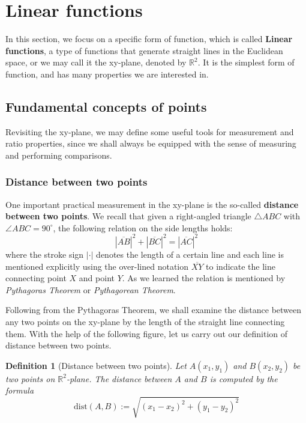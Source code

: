 \documentclass[12pt]{article}
\newtheorem{definition}{Definition}[section]
\begin{document}
    \newpage

    \section{Linear functions}

    In this section, we focus on a specific form of function, which is called \textbf{Linear functions}, a type of functions that generate straight lines in the Euclidean space, or we may call it the xy-plane, denoted by $\mathbb{R}^2$. It is the simplest form of function, and has many properties we are interested in.

    \subsection{Fundamental concepts of points}

    Revisiting the xy-plane, we may define some useful tools for measurement and ratio properties, since we shall always be equipped with the sense of measuring and performing comparisons.

    \subsubsection*{Distance between two points}

    One important practical measurement in the xy-plane is the so-called \textbf{distance between two points}. We recall that given a right-angled triangle $\triangle ABC$ with $\angle ABC = 90^\circ$, the following relation on the side lengths holds: $$|\overline{AB}|^2+|\overline{BC}|^2=|\overline{AC}|^2$$ where the stroke sign $|\cdot|$ denotes the length of a certain line and each line is mentioned explicitly using the over-lined notation $\overline{XY}$ to indicate the line connecting point $X$ and point $Y$. As we learned the relation is mentioned by \textit{Pythagoras Theorem} or \textit{Pythagorean Theorem}.
    
    Following from the Pythagoras Theorem, we shall examine the distance between any two points on the xy-plane by the length of the straight line connecting them. With the help of the following figure, let us carry out our definition of distance between two points.

    \begin{definition}[Distance between two points]
        Let $A(x_1,y_1)$ and $B(x_2,y_2)$ be two points on $\mathbb{R}^2$-plane. The distance between $A$ and $B$ is computed by the formula $$\mathrm{dist}(A,B):=\sqrt{(x_1-x_2)^2+(y_1-y_2)^2}$$
    \end{definition}
\end{document}
